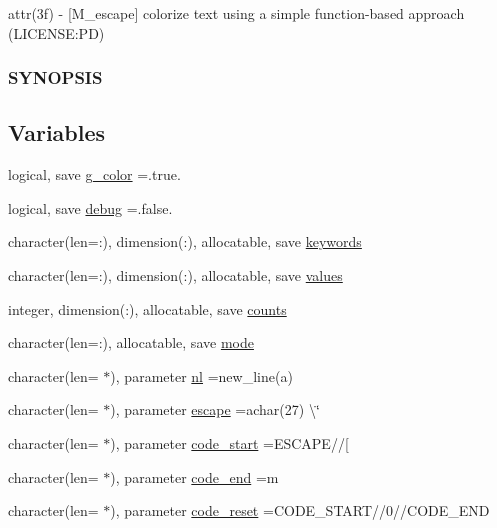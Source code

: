 \begin{DoxyCompactItemize}
\begin{DoxyCompactList}
attr(3f) -\/ \mbox{[}M\+\_\+escape\mbox{]} colorize text using a simple function-\/based approach (L\+I\+C\+E\+N\+SE\+:PD) \subsubsection*{S\+Y\+N\+O\+P\+S\+IS}\end{DoxyCompactList}\end{DoxyCompactItemize}
\subsection*{Variables}
\begin{DoxyCompactItemize}
\item 
logical, save \mbox{\hyperlink{namespacem__escape_a67ff4e5b90da8436f0da5882c4a5720c}{g\+\_\+color}} =.true.
\item 
logical, save \mbox{\hyperlink{namespacem__escape_af068eb2561159352a9a406c95157b131}{debug}} =.false.
\item 
character(len=\+:), dimension(\+:), allocatable, save \mbox{\hyperlink{namespacem__escape_a35e957e007844dbfe641b3d915fba048}{keywords}}
\item 
character(len=\+:), dimension(\+:), allocatable, save \mbox{\hyperlink{namespacem__escape_a4c3b430bde66148e6f2c79c5418384fa}{values}}
\item 
integer, dimension(\+:), allocatable, save \mbox{\hyperlink{namespacem__escape_a7e8e011813de1e58d7c8bcda489d8f1c}{counts}}
\item 
character(len=\+:), allocatable, save \mbox{\hyperlink{namespacem__escape_ab4e7fcb41457772a9bd4e4413d5355d6}{mode}}
\item 
character(len= $\ast$), parameter \mbox{\hyperlink{namespacem__escape_aa17be0f87e5ec9012a38c04bfbb5e588}{nl}} =new\+\_\+line(\textquotesingle{}a\textquotesingle{})
\item 
character(len= $\ast$), parameter \mbox{\hyperlink{namespacem__escape_a9931f535eb0f6f24df5a121331faa5ef}{escape}} =achar(27) \textbackslash{}\char`\"{}
\item 
character(len= $\ast$), parameter \mbox{\hyperlink{namespacem__escape_a6d5af6b1571cba22511523c53c71fa6f}{code\+\_\+start}} =E\+S\+C\+A\+PE//\textquotesingle{}\mbox{[}\textquotesingle{}
\item 
character(len= $\ast$), parameter \mbox{\hyperlink{namespacem__escape_af913c326395b9bf2c089c30698d2c742}{code\+\_\+end}} =\textquotesingle{}m\textquotesingle{}
\item 
character(len= $\ast$), parameter \mbox{\hyperlink{namespacem__escape_aaaf7224f2104dcd571cdaa69b61b9d01}{code\+\_\+reset}} =C\+O\+D\+E\+\_\+\+S\+T\+A\+RT//\textquotesingle{}0\textquotesingle{}//C\+O\+D\+E\+\_\+\+E\+ND

\end{DoxyCompactItemize}
